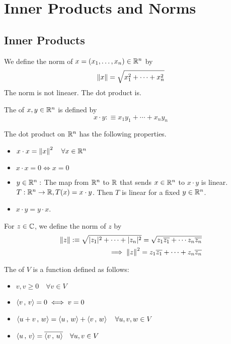 \section{Inner Products and Norms}

\subsection{Inner Products}
We define the norm of $x=(x_1, \ldots, x_n) \in \mathbb{R}^n$ by
\begin{equation}
  \left \lVert x \right \rVert = \sqrt{x_1^2 + \cdots + x_n^2}
\end{equation}
The norm is not lineaer. The dot product is.

\begin{mydef} 
  The  of $x,y \in \mathbb{R}^n$ is defined by
  \begin{equation}
    x \cdot y :\equiv x_1 y_1 + \cdots + x_n y_n
  \end{equation}
\end{mydef}

The dot product on $\mathbb{R}^n$ has the following properties.
\begin{itemize}
  \item $x \cdot x = \left \lVert x \right \rVert^2 \quad \forall x \in \mathbb{R}^n$
  \item $x \cdot x = 0 \iff x= 0$
  \item $y\in \mathbb{R}^n:$ The map from $\mathbb{R}^n$ to $\mathbb{R}$ that sends $x \in \mathbb{R}^n$ to $x\cdot y$ is linear. \\
  $T: \mathbb{R}^n \to \mathbb{R}, T(x) = x \cdot y$. Then $T$ is linear for a fixed $y \in \mathbb{R}^n$. %
  \item $x \cdot y = y \cdot x$.
\end{itemize}

For $z \in \mathbb{C}$, we define the norm of $z$ by
\begin{equation}
  \begin{aligned}
    \left \lVert z \right \rVert :\equiv \sqrt{ |z_1|^2 + \cdots + |z_n|^2} = \sqrt{ z_1 \overline {z_1} + \cdots z_n \overline {z_n}} \\
    \implies \left \lVert z \right \rVert^2 = z_1 \overline{z_1} + \cdots + z_n \overline{z_n}
  \end{aligned}
\end{equation}

\begin{mydef} 
  The  of $V$ is a function defined as follows:
  \begin{itemize}
    \item {} $
    {v,v} \geq 0 \quad \forall v \in V$
    \item {} $\left \langle v \, , \, v \right \rangle = 0 \iff v=0$
    \item {} $\left \langle u+v \, , \, w \right \rangle=\left \langle u \, , \, w \right \rangle+\left \langle v \, , \, w \right \rangle \quad \forall u,v,w \in V$
    \item {} $\left \langle u \, , \, v \right \rangle = \overline{\left \langle v \, , \, u \right \rangle} \quad \forall u, v \in V$
  \end{itemize}
\end{mydef}

